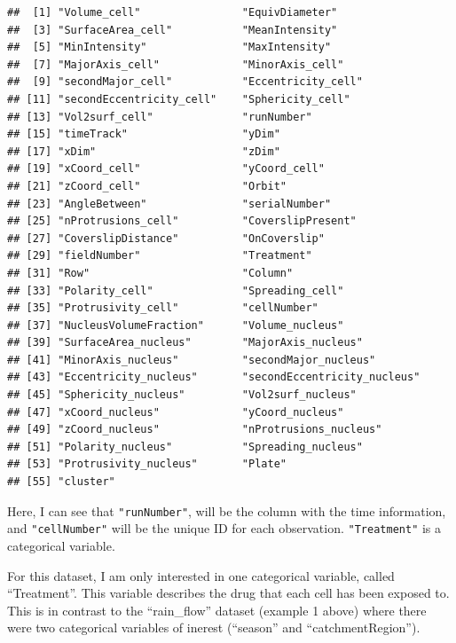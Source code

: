 \documentclass[
]{article}
\begin{document}
\begin{verbatim}
##  [1] "Volume_cell"                "EquivDiameter"             
##  [3] "SurfaceArea_cell"           "MeanIntensity"             
##  [5] "MinIntensity"               "MaxIntensity"              
##  [7] "MajorAxis_cell"             "MinorAxis_cell"            
##  [9] "secondMajor_cell"           "Eccentricity_cell"         
## [11] "secondEccentricity_cell"    "Sphericity_cell"           
## [13] "Vol2surf_cell"              "runNumber"                 
## [15] "timeTrack"                  "yDim"                      
## [17] "xDim"                       "zDim"                      
## [19] "xCoord_cell"                "yCoord_cell"               
## [21] "zCoord_cell"                "Orbit"                     
## [23] "AngleBetween"               "serialNumber"              
## [25] "nProtrusions_cell"          "CoverslipPresent"          
## [27] "CoverslipDistance"          "OnCoverslip"               
## [29] "fieldNumber"                "Treatment"                 
## [31] "Row"                        "Column"                    
## [33] "Polarity_cell"              "Spreading_cell"            
## [35] "Protrusivity_cell"          "cellNumber"                
## [37] "NucleusVolumeFraction"      "Volume_nucleus"            
## [39] "SurfaceArea_nucleus"        "MajorAxis_nucleus"         
## [41] "MinorAxis_nucleus"          "secondMajor_nucleus"       
## [43] "Eccentricity_nucleus"       "secondEccentricity_nucleus"
## [45] "Sphericity_nucleus"         "Vol2surf_nucleus"          
## [47] "xCoord_nucleus"             "yCoord_nucleus"            
## [49] "zCoord_nucleus"             "nProtrusions_nucleus"      
## [51] "Polarity_nucleus"           "Spreading_nucleus"         
## [53] "Protrusivity_nucleus"       "Plate"                     
## [55] "cluster"
\end{verbatim}

Here, I can see that \texttt{"runNumber"}, will be the column with the
time information, and \texttt{"cellNumber"} will be the unique ID for
each observation. \texttt{"Treatment"} is a categorical variable.

For this dataset, I am only interested in one categorical variable,
called ``Treatment''. This variable describes the drug that each cell
has been exposed to. This is in contrast to the ``rain\_flow'' dataset
(example 1 above) where there were two categorical variables of inerest
(``season'' and ``catchmentRegion'').\\
\end{document}
